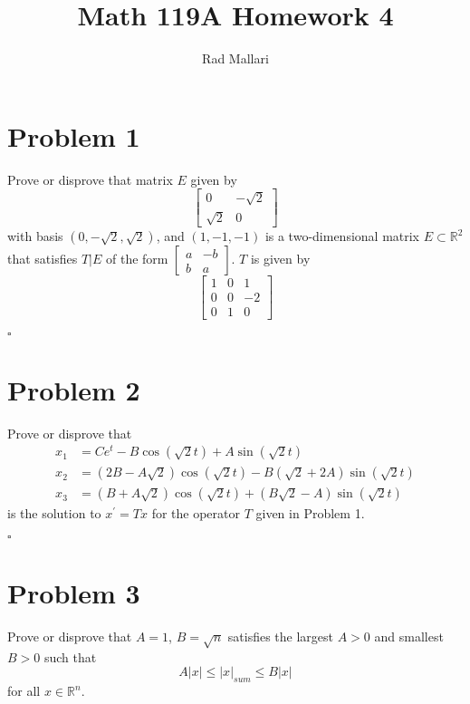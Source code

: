 \documentclass[11pt]{article}
\title{Math 119A Homework 4}
\author{Rad Mallari}
\newcommand{\R}{\mathbb{R}}
\newenvironment{proof}{\noindent{\bf Proof.}}{\hfill $\square$\medskip}
\begin{document}
\maketitle

\section{Problem 1}
Prove or disprove that matrix $E$ given by
$$\begin{bmatrix}
        0        & -\sqrt{2} \\
        \sqrt{2} & 0
    \end{bmatrix}$$
with basis $(0,-\sqrt{2},\sqrt{2})$, and $(1,-1,-1)$ is a two-dimensional
matrix $E\subset\R^{2}$ that satisfies $T\vert E$ of the form
$\begin{bmatrix}
        a & -b \\
        b & a
    \end{bmatrix}$. $T$ is given by
$$\begin{bmatrix}
    1&0&1\\
    0&0&-2\\
    0&1&0
\end{bmatrix}$$

\begin{proof}

\end{proof}

\section{Problem 2}
Prove or disprove that
\begin{equation}
    \begin{split}
        x_{1}&=Ce^{t}-B\cos(\sqrt{2}t)+A\sin(\sqrt{2}t)\\
        x_{2}&=(2B-A\sqrt{2})\cos(\sqrt{2}t)-B(\sqrt{2}+2A)\sin(\sqrt{2}t)\\
        x_{3}&=(B+A\sqrt{2})\cos(\sqrt{2}t)+(B\sqrt{2}-A)\sin(\sqrt{2}t)
    \end{split}
\end{equation}
is the solution to $x^{\prime}=Tx$ for the operator $T$ given in Problem 1.

\begin{proof}

\end{proof}

\section{Problem 3}
Prove or disprove that $A=1$, $B=\sqrt{n}$ satisfies the largest $A>0$ and smallest
$B>0$ such that
$$A\lvert x\rvert\leq\lvert x\rvert_{sum}\leq B\lvert x\rvert$$
for all $x\in\R^{n}$.
\end{document}
